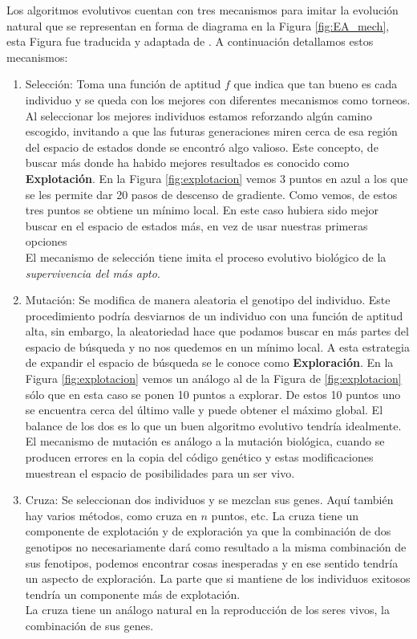 Los algoritmos evolutivos cuentan con tres mecanismos para imitar la evolución natural que se representan en forma de diagrama en la Figura \ref{fig:EA_mech}, esta Figura fue traducida y adaptada de \cite{coelloEvolutionaryAlgorithmsSolving}. A continuación detallamos estos mecanismos: 

\begin{enumerate}
    \item Selección: Toma una función de aptitud $f$ que indica que tan bueno es cada individuo y se queda con los mejores con diferentes mecanismos como torneos. Al seleccionar los mejores individuos estamos reforzando algún camino escogido, invitando a que las futuras generaciones miren cerca de esa región del espacio de estados donde se encontró algo valioso. Este concepto, de buscar más donde ha habido mejores resultados es conocido como \textbf{Explotación}. En la Figura \ref{fig:explotacion} vemos 3 puntos en azul a los que se les permite dar 20 pasos de descenso de gradiente. Como vemos, de estos tres puntos se obtiene 
    un mínimo local. En este caso hubiera sido mejor buscar en el espacio de estados más, en vez de usar nuestras primeras opciones \\El mecanismo de selección tiene imita el proceso evolutivo biológico de la \emph{supervivencia del más apto}.
    \item Mutación: Se modifica de manera aleatoria el genotipo del individuo. Este procedimiento podría desviarnos de un individuo con una función de aptitud alta, sin embargo, la aleatoriedad hace que podamos buscar en más partes del espacio de búsqueda y no nos quedemos en un mínimo local. A esta estrategia de expandir el espacio de búsqueda se le conoce como \textbf{Exploración}. En la Figura \ref{fig:explotacion} vemos un análogo al de la Figura de \ref{fig:explotacion} sólo que en esta caso se ponen 10 puntos a explorar. De estos 10 puntos uno se encuentra cerca del último valle y puede obtener el máximo global. El balance de los dos es lo que un buen algoritmo evolutivo tendría idealmente. \\ El mecanismo de mutación es análogo a la mutación biológica, cuando se producen errores en la copia del código genético y estas modificaciones muestrean el espacio de posibilidades para un ser vivo.   
    \item Cruza: Se seleccionan dos individuos y se mezclan sus genes. Aquí también hay varios métodos, como cruza en $n$ puntos, etc. La cruza tiene un componente de explotación y de exploración ya que la combinación de dos genotipos no necesariamente dará como resultado a la misma combinación de sus fenotipos, podemos encontrar cosas inesperadas y en ese sentido tendría un aspecto de exploración. La parte que si mantiene de los individuos exitosos tendría un componente más de explotación. \\La cruza tiene un análogo natural en la reproducción de los seres vivos, la combinación de sus genes. 
\end{enumerate}

